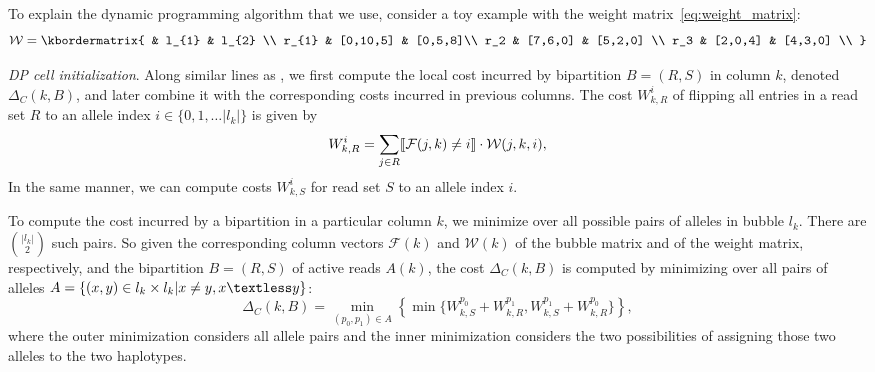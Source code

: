 To explain the dynamic programming algorithm that we use, consider a toy example with the weight matrix~\eqref{eq:weight_matrix}:
\begin{equation}\label{eq:weight_matrix1}
  \mathcal{W}  = \kbordermatrix{
     & l_{1}       & l_{2}  \\
    r_{1}       & [0,10,5] &  [0,5,8]\\
    r_2 & [7,6,0] & [5,2,0] \\
    r_3 & [2,0,4] & [4,3,0] \\
  }
\end{equation}

\textit{DP cell initialization}. Along similar lines as \cite{patterson2014whatshap}, we first compute the local cost incurred by bipartition $B= (R,S)$ in column $k$, denoted $\Delta_C(k,B)$, and later combine it with the corresponding costs incurred in previous columns.
The cost $W_{k,R}^i$ of flipping all entries in a read set $R$ to an allele index $i\in\{0,1,\ldots |l_k|\}$ is given by 
\[W_{k,R}^i = \sum_{j\in R}\llbracket \mathcal{F}(j,k)\neq i\rrbracket\cdot\mathcal{W}(j,k,i),\]
In the same manner, we can compute costs $W_{k,S}^i$ for read set $S$ to an allele index $i$.

To compute the cost incurred by a bipartition in a particular column $k$, we minimize over all possible pairs of alleles in bubble $l_k$.
There are ${|l_k| \choose 2}$ such pairs.
So given the corresponding column vectors $\mathcal{F}(k)$ and $\mathcal{W}(k)$ of the bubble matrix and of the weight matrix, respectively, and the bipartition $B=(R,S)$ of active reads $A(k)$, the cost $\Delta_C(k,B)$ is computed by minimizing over all pairs of alleles
$A = \{(x,y) \in l_k \times l_k | x \ne y, x\textless y\}$:
\begin{equation}\label{eq:dp-cell}
  \Delta_C(k,B)= \min_{(p_0,p_1)\in {A}}\left\{\min\{W_{k,S}^{p_0} + W_{k,R}^{p_1}, W_{k,S}^{p_1} + W_{k,R}^{p_0}\}\right\},
\end{equation}
where the outer minimization considers all allele pairs and the inner minimization considers the two possibilities of assigning those two alleles to the two haplotypes.

   

%     

